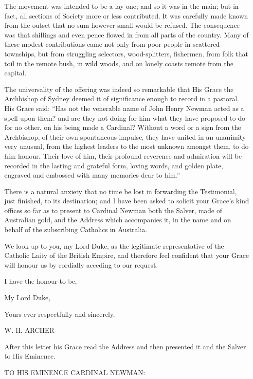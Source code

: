 The movement was intended to be a lay one; and so it was in the
main; but in fact, all sections of Society more or less contributed.
It was carefully made known from the outset that no sum however small
would be refused. The consequence was that shillings and even pence
flowed in from all parts of the country. Many of these modest
contributions came not only from poor people in scattered townships,
but from struggling selectors, wood-splitters, fishermen, from folk
that toil in the remote bush, in wild woods, and on lonely coasts
remote from the capital.

The universality of the offering was indeed so remarkable that His
Grace the Archbishop of Sydney deemed it of significance enough to
record in a pastoral. His Grace said: ``Has not the venerable name
of John Henry Newman acted as a spell upon them? and are they not
doing for him what they have proposed to do for no other, on his being
made a Cardinal? Without a word or a sign from the Archbishop, of
their own spontaneous impulse, they have united in an unanimity
very unusual, from the highest leaders to the most unknown amongst
them, to do him honour. Their love of him, their profound reverence
and admiration will be recorded in the lasting and grateful form,
loving words, and golden plate, engraved and embossed with many
memories dear to him.''

There is a natural anxiety that no time be lost in forwarding the
Testimonial, just finished, to its destination; and I have been asked
to solicit your Grace's kind offices so far as to present to Cardinal
Newman both the Salver, made of Australian gold, and the Address which
accompanies it, in the name and on behalf of the subscribing Catholics
in Australia.

We look up to you, my Lord Duke, as the legitimate representative
of the Catholic Laity of the British Empire, and therefore feel
confident that your Grace will honour us by cordially acceding to our
request.

I have the honour to be,

My Lord Duke,

Yours ever respectfully and sincerely,

W. H. ARCHER

After this letter his Grace read the Address and then presented it
and the Salver to His Eminence.


TO HIS EMINENCE
CARDINAL NEWMAN:

